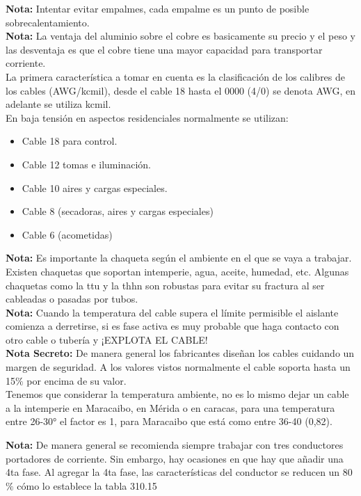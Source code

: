 \documentclass[11pt,letterpaper]{article}
\begin{document}
\textbf{Nota:} Intentar evitar empalmes, cada empalme es un punto de posible sobrecalentamiento.\\

\textbf{Nota:} La ventaja del aluminio sobre el cobre es basicamente su precio y el peso y las desventaja es que el cobre tiene una mayor capacidad para transportar corriente.\\
 
La primera característica a tomar en cuenta es la clasificación de los calibres de los cables (AWG/kcmil), desde el cable 18 hasta el 0000 (4/0) se denota AWG, en adelante se utiliza kcmil.\\

En baja tensión en aspectos residenciales normalmente se utilizan:

\begin{itemize}
	\item Cable 18 para control.
	\item Cable 12 tomas e iluminación.
	\item Cable 10 aires y cargas especiales.
	\item Cable 8 (secadoras, aires y cargas especiales)
	\item Cable 6 (acometidas)
\end{itemize}

\textbf{Nota:} Es importante la chaqueta según el ambiente en el que se vaya a trabajar. Existen chaquetas que soportan intemperie, agua, aceite, humedad, etc. Algunas chaquetas como la ttu y la thhn son robustas para evitar su fractura al ser cableadas o pasadas por tubos.\\

\textbf{Nota:} Cuando la temperatura del cable supera el límite permisible el aislante comienza a derretirse, si es fase activa es muy probable que haga contacto con otro cable o tubería y ¡EXPLOTA EL CABLE!\\

\textbf{Nota Secreto:} De manera general los fabricantes diseñan los cables cuidando un margen de seguridad. A los valores vistos normalmente el cable soporta hasta un 15$\%$ por encima de su valor.\\

Tenemos que considerar la temperatura ambiente, no es lo mismo dejar un cable a la intemperie en Maracaibo, en Mérida o en caracas, para una temperatura entre 26-30° el factor es 1, para Maracaibo que está como entre 36-40 (0,82).

\textbf{Nota:} De manera general se recomienda siempre trabajar con tres conductores portadores de corriente. Sin embargo, hay ocasiones en que hay que añadir una 4ta fase. Al agregar la 4ta fase, las características del conductor se reducen un 80$\%$ cómo lo establece la tabla 310.15\\
\end{document}
